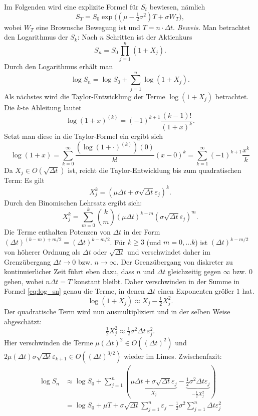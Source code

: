 Im Folgenden wird eine explizite Formel für $S_t$ bewiesen, nämlich
$$S_T = S_0 \exp\!\Big( (\mu - \tfrac12 \sigma^2)T + \sigma W_T \Big),$$
wobei $W_T$ eine Brownsche Bewegung ist und $T=n \cdot \Delta t$. \textit{Beweis.}
Man betrachtet den Logarithmus der $S_k$: Nach $n$ Schritten ist der Aktienkurs
$$
S_n = S_0 \prod_{j=1}^n (1 + X_j).
$$
Durch den Logarithmus erhält man
\begin{equation} \label{eq:log_sn}
\log S_n = \log S_0 + \sum_{j=1}^n \log(1+X_j).
\end{equation}
Als nächstes wird die Taylor-Entwicklung der Terme $\log(1+X_j)$ betrachtet. Die $k$-te Ableitung lautet
$$\log(1+x)^{(k)}=(-1)^{k+1} \frac{(k-1)!}{(1+x)^k}.$$
Setzt man diese in die Taylor-Formel ein ergibt sich
$$\log(1+x) = \sum_{k=0}^{\infty} \frac{(\log(1+\cdot)^{(k)})(0)}{k!}(x-0)^k= \sum_{k=1}^\infty(-1)^{k+1} \frac{x^k}{k}$$
Da $X_j \in O(\sqrt{\Delta t})$ ist, reicht die Taylor-Entwicklung bis zum quadratischen Term: Es gilt
$$
X_j^k = (\mu \Delta t + \sigma \sqrt{\Delta t} \varepsilon_j)^k.
$$
Durch den Binomischen Lehrsatz ergibt sich:
$$
X_j^k = \sum_{m=0}^k \binom{k}{m} (\mu \Delta t)^{k-m} (\sigma \sqrt{\Delta t} \varepsilon_j)^m.
$$
Die Terme enthalten Potenzen von $\Delta t$ in der Form $(\Delta t)^{(k-m) + m/2} = (\Delta t)^{k-m/2}$. Für $k \geq 3$ (und $m=0,\dots k$) ist $(\Delta t)^{k-m/2}$ von 
höherer Ordnung als $\Delta t$ oder $\sqrt{\Delta t}$ und verschwindet daher im Grenzübergang $\Delta t \to 0$ bzw. $n \to \infty$. Der Grenzübergang 
von diskreter zu kontinuierlicher Zeit führt eben dazu, dass $n$ und $\Delta t$ gleichzeitig gegen $\infty$ bzw. $0$ gehen, wobei $n \Delta t = T$ konstant bleibt.
Daher verschwinden in der Summe in Formel \ref{eq:log_sn} genau die Terme, in denen $\Delta t$ einen Exponenten größer $1$ hat.
$$
\log(1+X_j) \approx X_j - \tfrac12 X_j^2.
$$
Der quadratische Term wird nun ausmultipliziert und in der selben Weise abgeschätzt:
$$
\tfrac12 X_j^2 \approx \tfrac12 \sigma^2 \Delta t \,\varepsilon_j^2.
$$
Hier verschwinden die Terme $\mu (\Delta t)^2 \in O((\Delta t)^{2})$ und $2 \mu (\Delta t) \sigma \sqrt{\Delta t} \varepsilon_{k+1} \in O((\Delta t)^{3/2})$ wieder im Limes. Zwischenfazit:
$$
\begin{aligned}
\log S_n &\approx \log S_0 + \sum_{j=1}^n\left( \underbrace{\mu \Delta t + \sigma\sqrt{\Delta t} \varepsilon_j}_{X_j} - \underbrace{\frac{1}{2} \sigma^2 \Delta t \varepsilon_j}_{-\frac{1}{2} X_j^2} \right)
\\ &= \log S_0 + \mu T + \sigma\sqrt{\Delta t} \sum_{j=1}^{n} \varepsilon_j - \frac{1}{2} \sigma^2 \sum_{j=1}^{n} \Delta t \varepsilon_j^2 
\end{aligned}
$$

